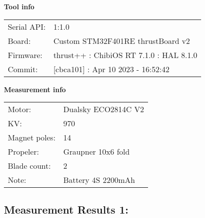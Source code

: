 \documentclass[10pt]{article}
\begin{document}
\noindent
{\large \bf Tool info}
\vspace{3mm}

\noindent
\begin{tabular}{ll}
Serial API:  & 1:1.0\\ 
Board:       & Custom STM32F401RE thrustBoard v2\\ 
Firmware:    & thrust++ : ChibiOS RT 7.1.0 : HAL 8.1.0\\ 
Commit:      & [cbca101] : Apr 10 2023 - 16:52:42
\end{tabular}
\vspace{3mm}

\noindent
{\large \bf Measurement info}
\vspace{3mm}

\noindent
\begin{tabular}{ll}
Motor:        & Dualsky ECO2814C V2\\ 
KV:           & 970\\ 
Magnet poles: & 14\\ 
Propeler:     & Graupner 10x6 fold\\ 
Blade count:  & 2\\ 
Note:         & Battery 4S 2200mAh
\end{tabular}

\vspace{3mm}


\subsection*{\large \bf Measurement Results 1:}
\end{document}
